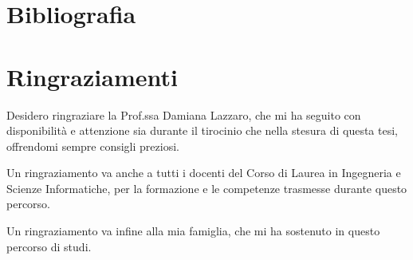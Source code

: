 \documentclass[12pt,a4paper,twoside]{book}
\begin{document}
\chapter*{Bibliografia}

\newpage


\newpage
\chapter*{Ringraziamenti}

Desidero ringraziare la Prof.ssa Damiana Lazzaro, che mi ha seguito con disponibilità e attenzione sia durante il tirocinio che nella stesura di questa tesi, offrendomi sempre consigli preziosi.

Un ringraziamento va anche a tutti i docenti del Corso di Laurea in Ingegneria e Scienze Informatiche, per la formazione e le competenze trasmesse durante questo percorso.

Un ringraziamento va infine alla mia famiglia, che mi ha sostenuto in questo percorso di studi.
\end{document}
